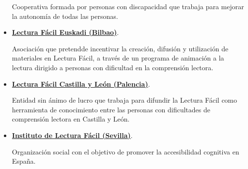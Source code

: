 \begin{itemize}
	Cooperativa formada por personas con discapacidad
	que trabaja para mejorar la autonomía de todas las personas.
	
	\item \href{https://lecturafacileuskadi.net/}{\textbf{Lectura Fácil Euskadi (Bilbao)}}.
	
	Asociación que pretendde incentivar la creación, difusión y utilización de materiales en Lectura Fácil, a través de un programa de animación a la lectura dirigido a personas con dificultad en la comprensión lectora.
	\item \href{http://www.lecturafacyl.es/}{\textbf{Lectura Fácil Castilla y León (Palencia)}}.
	
	Entidad sin ánimo de lucro que trabaja para difundir la Lectura Fácil como herramienta de conocimiento entre las personas con dificultades de comprensión lectora en Castilla y León.
	\item \href{http://www.institutolecturafacil.org/}{\textbf{Instituto de Lectura Fácil (Sevilla)}}.
	
	Organización social con el objetivo de promover la accesibilidad cognitiva en España.
\end{itemize}

